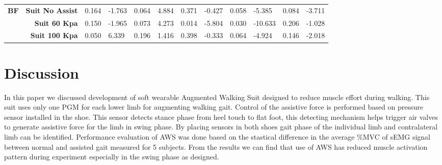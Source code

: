 \documentclass[letterpaper, 10 pt, conference]{ieeeconf}  %
\begin{document}
\begin{table*}[]
\begin{tabular}{@{}lrllllllllll@{}}
		\textbf{BF}                          & \textbf{Suit No Assist}                 & 0.164                                & -1.763                               & 0.064                                & 4.884                                & 0.371                                & -0.427                               & 0.058                                & -5.385                               & 0.084                                & -3.711                               \\
		\textbf{}                            & \textbf{Suit 60 Kpa}                    & 0.150                                & -1.965                               & 0.073                                & 4.273                                & 0.014                                & -5.804                               & 0.030                                & -10.633                              & 0.206                                & -1.028                               \\
		\textbf{}                            & \textbf{Suit 100 Kpa}                   & 0.050                                & 6.339                                & 0.196                                & 1.416                                & 0.398                                & -0.333                               & 0.064                                & -4.924                               & 0.146                                & -2.018                               \\ \bottomrule
	\end{tabular}

	\label{ptvalues}
\end{table*}

\section{Discussion} \label{discuss}

In this paper we discussed development of soft wearable Augmented Walking Suit designed to reduce muscle effort during walking. This suit uses only one PGM for each lower limb for augmenting walking gait. Control of the assistive force is performed based on pressure sensor installed in the shoe. This sensor detects stance phase from heel touch to flat foot, this detecting mechanism helps trigger air valves to generate assistive force for the limb in swing phase. By placing sensors in both shoes gait phase of the individual limb and contralateral limb can be identified. Performance evaluation of AWS was done based on the stastical difference in the average \%MVC of sEMG signal between normal and assisted gait measured for 5 subjects. From the results we can find that use of AWS has reduced muscle activation pattern during experiment especially in the swing phase as designed. 
\end{document}
